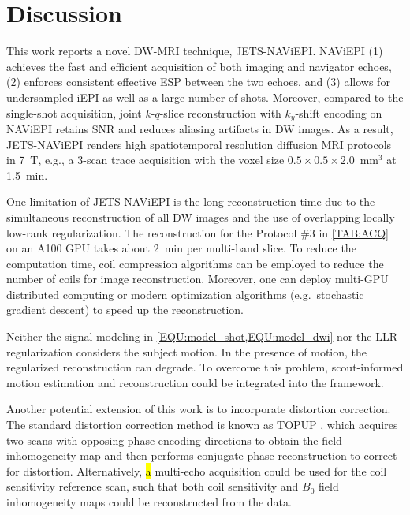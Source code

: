 \documentclass[preprint,12pt,authoryear,review]{elsarticle}
\begin{document}
    \clearpage

    \section{Discussion}
    \label{SEC:Disc}

    This work reports a novel DW-MRI technique, JETS-NAViEPI.
    NAViEPI (1) achieves the fast and efficient acquisition of
    both imaging and navigator echoes,
    (2) enforces consistent effective ESP between the two echoes, and
    (3) allows for undersampled iEPI as well as a large number of shots.
    Moreover, compared to the single-shot acquisition,
    joint $k$-$q$-slice reconstruction
    with $k_y$-shift encoding on NAViEPI
    retains SNR and reduces aliasing artifacts in DW images.
    As a result, JETS-NAViEPI renders high spatiotemporal resolution
    diffusion MRI protocols in \SI{7}{\tesla},
    e.g., a 3-scan trace acquisition with the voxel size
    $0.5\times0.5\times2.0$~mm$^3$ at \SI{1.5}{\minute}.

    One limitation of JETS-NAViEPI is the long reconstruction time
    due to the simultaneous reconstruction of all DW images and
    the use of overlapping locally low-rank regularization.
    The reconstruction for the Protocol \#3 in \cref{TAB:ACQ}
    on an A100 GPU takes about \SI{2}{\minute} per multi-band slice.
    To reduce the computation time, coil compression algorithms
    \citep{buehrer_2007_scc,huang_2008_scc}
    can be employed to reduce the number of coils for image reconstruction.
    Moreover, one can deploy multi-GPU distributed computing
    or modern optimization algorithms
    (e.g.~stochastic gradient descent) \citep{ong_2020_extreme}
    to speed up the reconstruction.

    Neither the signal modeling in
    \cref{EQU:model_shot,EQU:model_dwi}
    nor the LLR regularization considers the subject motion.
    In the presence of motion, the regularized reconstruction can degrade.
    To overcome this problem, scout-informed motion estimation
    and reconstruction \citep{polak_2022_samer}
    could be integrated into the framework.

    Another potential extension of this work is
    to incorporate distortion correction.
    The standard distortion correction method is
    known as TOPUP \citep{andersson_2003_topup},
    which acquires two scans
    with opposing phase-encoding directions to
    obtain the field inhomogeneity map and
    then performs conjugate phase reconstruction
    to correct for distortion.
    Alternatively, \hl{a} multi-echo acquisition could be used
    for the coil sensitivity reference scan, such that
    both coil sensitivity and $B_0$ field inhomogeneity maps
    could be reconstructed from the data.
\end{document}
